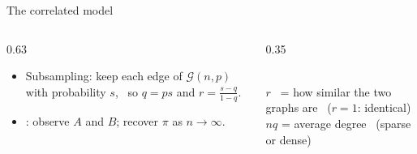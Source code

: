 \documentclass[aspectratio=169,10pt]{beamer}
\begin{document}
\begin{frame}{The correlated \ER model}
\begin{columns}[T,onlytextwidth]
\begin{column}{0.63\textwidth}
\begin{itemize}
\item<3-> Subsampling: keep each edge of $\mathcal G(n,p)$ with probability $s$, \ so $q=ps$ and $r=\frac{s-q}{1-q}$.
\item<4-> : observe $A$ and $B$; recover $\pi$ as $n\to\infty$.
\end{itemize}
\end{column}
\begin{column}{0.35\textwidth}
\begin{softbox}[paleO]
\small {}\\[0.6mm]
$r$ \ = how similar the two graphs are \ ($r=1$: identical)\\[0.6mm]
$nq$ = average degree \ (sparse or dense)
\end{softbox}
\end{column}
\end{columns}
\end{frame}
\end{document}
